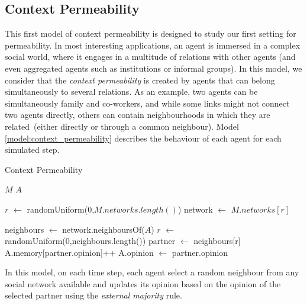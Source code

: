 \documentclass[preprint,number]{elsarticle}
\begin{document}
	\newpage
	\subsection{Context Permeability}
	This first model of context permeability \cite{Antunes2007,Antunes2010} is designed to study our first setting for permeability. In most interesting applications, an agent is immersed in a complex social world, where it engages in a multitude of relations with other agents (and even aggregated agents such as institutions or informal groups). In this model, we consider that the \textit{context permeability} is created by agents that can belong simultaneously to several relations. As an example, two agents can be simultaneously family and co-workers, and while some links might not connect two agents directly, others can contain neighbourhoods in which they are related~(either directly or through a common neighbour). Model \ref{model:context_permeability} describes the behaviour of each agent for each simulated step.
	\begin{algorithm}[H]
		\caption{Context Permeability}
		\label{model:context_permeability}
		\begin{algorithmic}
			\vspace{0.5em}
			\STATE $M$ 
			\STATE $A$ 
			\\ \hrulefill 
			
			\STATE{}
			\STATE $r$ $\leftarrow$ randomUniform(0,$ M.networks.length() $)
			\STATE network $\leftarrow$ $M.networks[r]$
			
			\STATE
			\STATE {}
			\STATE neighbours $\leftarrow$ network.neighboursOf($A$) 
			\STATE $r$ $\leftarrow$ randomUniform(0,neighbours.length())
			\STATE partner $\leftarrow$ neighbours[r]
			\STATE
			\STATE {}
			\STATE {}
			\STATE A.memory[partner.opinion]++
			\STATE A.opinion $\leftarrow$ partner.opinion
			\ENDIF
		\end{algorithmic}
	\end{algorithm}
	In this model, on each time step, each agent select a random neighbour from any 
	social network available and updates its opinion based on the opinion of the selected partner using the \textit{external majority} rule. 
	
\end{document}
